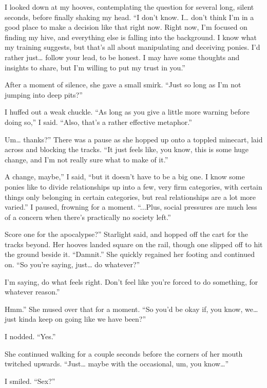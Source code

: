 I looked down at my hooves, contemplating the question for several long, silent seconds, before finally shaking my head. “I don’t know. I… don’t think I’m in a good place to make a decision like that right now. Right now, I’m focused on finding my hive, and everything else is falling into the background. I know what my training suggests, but that’s all about manipulating and deceiving ponies. I’d rather just… follow your lead, to be honest. I may have some thoughts and insights to share, but I’m willing to put my trust in you.”

After a moment of silence, she gave a small smirk. “Just so long as I’m not jumping into deep pits?”

I huffed out a weak chuckle. “As long as you give a little more warning before doing so,” I said. “Also, that’s a rather effective metaphor.”

\leavevmode{}Um… thanks?” There was a pause as she hopped up onto a toppled minecart, laid across and blocking the tracks. “It just feels like, you know, this is some huge change, and I’m not really sure what to make of it.”

\leavevmode{}A change, maybe,” I said, “but it doesn’t have to be a big one. I know some ponies like to divide relationships up into a few, very firm categories, with certain things only belonging in certain categories, but real relationships are a lot more varied.” I paused, frowning for a moment. “...Plus, social pressures are much less of a concern when there’s practically no society left.”

\leavevmode{}Score one for the apocalypse?” Starlight said, and hopped off the cart for the tracks beyond. Her hooves landed square on the rail, though one slipped off to hit the ground beside it. “Damnit.” She quickly regained her footing and continued on. “So you’re saying, just… do whatever?”

\leavevmode{}I’m saying, do what feels right. Don’t feel like you’re forced to do something, for whatever reason.”

\leavevmode{}Hmm.” She mused over that for a moment. “So you’d be okay if, you know, we… just kinda keep on going like we have been?”

I nodded. “Yes.”

She continued walking for a couple seconds before the corners of her mouth twitched upwards. “Just… maybe with the occasional, um, you know…”

I smiled. “Sex?”


